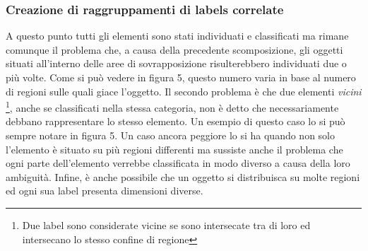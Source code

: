 \subsubsection{Creazione di raggruppamenti di labels correlate} 
A questo punto tutti gli elementi sono stati individuati e classificati ma rimane comunque il problema che, a causa della precedente scomposizione, gli oggetti situati all'interno delle aree di sovrapposizione risulterebbero individuati due o più volte. Come si può vedere in figura 5, questo numero varia in base al numero di regioni sulle quali giace l'oggetto. Il secondo problema è che due elementi \textit{vicini} \footnote{Due label sono considerate vicine se sono intersecate tra di loro ed intersecano lo stesso confine di regione}, anche se classificati nella stessa categoria, non è detto che necessariamente debbano rappresentare lo stesso elemento. Un esempio di questo caso lo si può sempre notare in figura 5. Un caso ancora peggiore lo si ha quando non solo l'elemento è situato su più regioni differenti ma sussiste anche il problema che ogni parte dell'elemento verrebbe classificata in modo diverso a causa della loro ambiguità. Infine, è anche possibile che un oggetto si distribuisca su molte regioni ed ogni sua label presenta dimensioni diverse.
